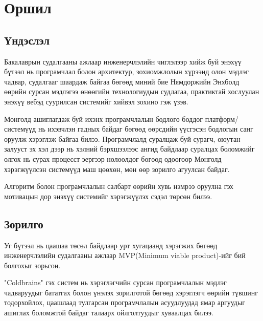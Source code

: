 \chapter{Оршил}
\section{Үндэслэл}
Бакалаврын судалгааны ажлаар инженерчлэлийн чиглэлээр хийж буй энэхүү бүтээл нь програмчлал болон архитектур, зохиомжлолын хүрээнд олон мэдлэг чадвар, судалгааг шаардаж байгаа бөгөөд миний бие Нямдоржийн Энхболд өөрийн сурсан мэдлэгээ өнөөгийн технологиудын судлагаа, практиктай хослуулан энэхүү вебэд суурилсан системийг хийвэл зохино гэж үзэв. 

Монголд ашиглагдаж буй ихэнх програмчлалын бодлого боддог платформ/системүүд нь ихэвчлэн гадных байдаг бөгөөд өөрсдийн үүсгэсэн бодлогын санг оруулж хэрэглэж байгаа билээ. Програмчлалд суралцаж буй сурагч, оюутан залууст эх хэл дээр нь хэлний бэрхшээлээс ангид байдлаар суралцах боломжийг олгох нь сурах процесст эергээр нөлөөлдөг бөгөөд одоогоор Монголд хэрэгжүүлсэн системүүд маш цөөхөн, мөн өөр зорилго агуулсан байдаг.

Алгоритм болон програмчлалын салбарт өөрийн хувь нэмрээ оруулна гэх мотивацын дор энэхүү системийг хэрэгжүүлэх сэдэл төрсөн билээ.

\section{Зорилго}
Уг бүтээл нь цаашаа төсөл байдлаар урт хугацаанд хэрэгжих бөгөөд инженерчлэлийн судалгааны ажлаар MVP(Minimum viable product)-ийг бий болгохыг зорьсон.

"Coldbrains" гэх систем нь хэрэглэгчийн сурсан програмчлалын мэдлэг чадваруудыг бататгах болон үнэлэх зорилготой бөгөөд хэрэглэгч өөрийн түвшинг тодорхойлох, цаашлаад тулгарсан програмчлалын асуудлуудад ямар аргуудыг ашиглах боломжтой байдаг талаарх ойлголтуудыг хуваалцах билээ.

